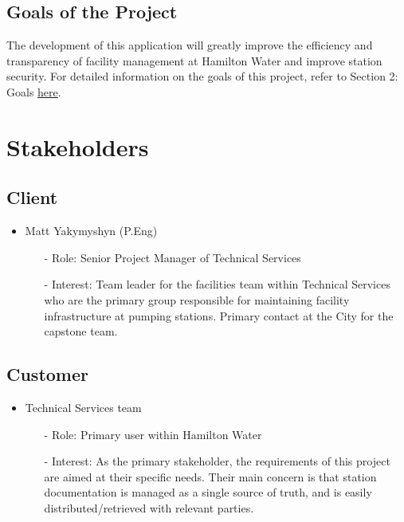 \documentclass[12pt]{article}
\begin{document}
\subsection{Goals of the Project}
The development of this application will greatly improve the
efficiency and transparency of facility management at Hamilton Water
and improve station security. For detailed information on the goals
of this project, refer to Section 2: Goals
\href{https://github.com/Spitgranger/capstone/blob/main/docs/ProblemStatementAndGoals/ProblemStatement.pdf}{here}.
\section{Stakeholders}
\subsection{Client}

\begin{itemize}
  \item Matt Yakymyshyn (P.Eng)
    \begin{itemize}
      \item[-] Role: Senior Project Manager of Technical Services
      \item[-] Interest: Team leader for the facilities team within
        Technical Services who are the primary group responsible for
        maintaining facility infrastructure at pumping stations.
        Primary contact at the City for the capstone team.
    \end{itemize}
\end{itemize}

\subsection{Customer}

\begin{itemize}
  \item Technical Services team
    \begin{itemize}
      \item[-] Role: Primary user within Hamilton Water
      \item[-] Interest: As the primary stakeholder, the requirements
        of this project are aimed at their specific needs. Their main concern
        is that station documentation is managed as a single source of truth,
        and is easily distributed/retrieved with relevant parties.
    \end{itemize}
\end{itemize}
\end{document}
